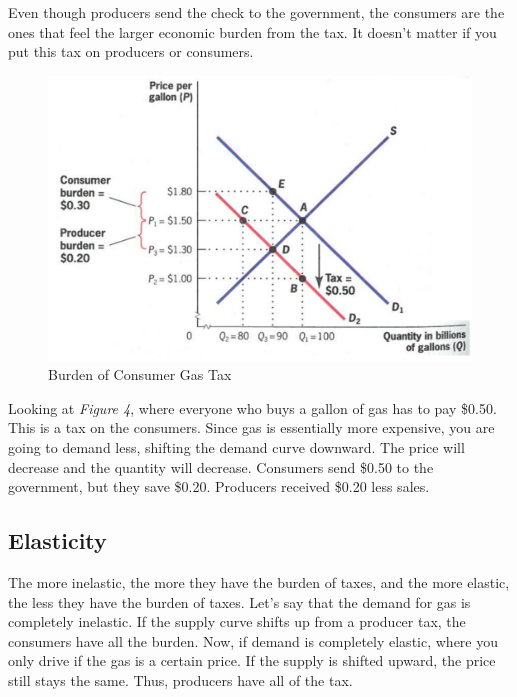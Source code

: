 \documentclass{article}
\begin{document}
Even though producers send the check to the government, the consumers are the
ones that feel the larger economic burden from the tax. It doesn't matter if you
put this tax on producers or consumers. 

\begin{figure}[H]
    \centering
    \includegraphics[scale=0.35]{"Burden of Consumer Gas Tax"}
    \caption{Burden of Consumer Gas Tax}
\end{figure}

Looking at \textit{Figure 4}, where everyone who buys a gallon of gas has to pay
\$0.50. This is a tax on the consumers. Since gas is essentially more expensive,
you are going to demand less, shifting the demand curve downward. The price will
decrease and the quantity will decrease. Consumers send \$0.50 to the
government, but they save \$0.20. Producers received \$0.20 less sales. 

\subsection{ Elasticity }

The more inelastic, the more they have the burden of taxes, and the more
elastic, the less they have the burden of taxes. Let's say that the demand for
gas is completely inelastic. If the supply curve shifts up from a producer tax,
the consumers have all the burden. Now, if demand is completely elastic, where
you only drive if the gas is a certain price. If the supply is shifted upward,
the price still stays the same. Thus, producers have all of the tax. 
\end{document}
